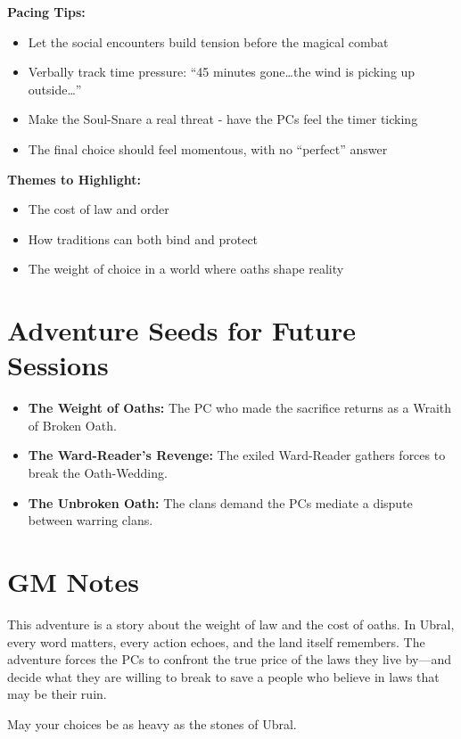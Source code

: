 \documentclass[11pt]{article}
\begin{document}
\textbf{Pacing Tips:}
\begin{itemize}
    \item Let the social encounters build tension before the magical combat
    \item Verbally track time pressure: ``45 minutes gone\dots the wind is picking up outside\dots''
    \item Make the Soul-Snare a real threat - have the PCs feel the timer ticking
    \item The final choice should feel momentous, with no ``perfect'' answer
\end{itemize}

\textbf{Themes to Highlight:}
\begin{itemize}
    \item The cost of law and order
    \item How traditions can both bind and protect
    \item The weight of choice in a world where oaths shape reality
\end{itemize}

\section*{Adventure Seeds for Future Sessions}
\begin{itemize}
    \item \textbf{The Weight of Oaths:} The PC who made the sacrifice returns as a Wraith of Broken Oath.
    \item \textbf{The Ward-Reader's Revenge:} The exiled Ward-Reader gathers forces to break the Oath-Wedding.
    \item \textbf{The Unbroken Oath:} The clans demand the PCs mediate a dispute between warring clans.
\end{itemize}

\section*{GM Notes}
This adventure is a story about the weight of law and the cost of oaths. In Ubral, every word matters, every action echoes, and the land itself remembers. The adventure forces the PCs to confront the true price of the laws they live by---and decide what they are willing to break to save a people who believe in laws that may be their ruin.

May your choices be as heavy as the stones of Ubral.


\end{document}
